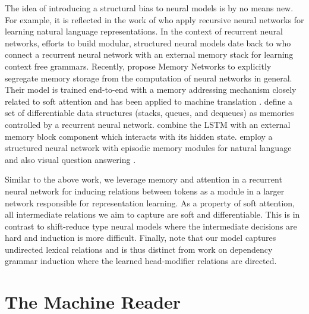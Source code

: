 \documentclass[11pt,letterpaper]{article}
\begin{document}
        The idea of introducing a structural bias to neural models is
        by no means new. For example, it is reflected in the work of
         who apply recursive neural
        networks for learning natural language representations.  In
        the context of recurrent neural networks, efforts to build
        modular, structured neural models date back to
         who connect a recurrent neural
        network with an external memory stack for learning context
        free grammars. Recently,  propose
        Memory Networks to explicitly segregate memory storage from
        the computation of neural networks in general. Their model is
        trained end-to-end with a memory addressing mechanism closely
        related to soft attention \cite{sukhbaatar2015end} and has
        been applied to machine translation \cite{meng2016deep}.
         define a set of
        differentiable data structures (stacks, queues, and dequeues)
        as memories controlled by a recurrent neural
        network.  combine the LSTM with an
        external memory block component which interacts with its
        hidden state.   employ a structured
        neural network with episodic memory modules for natural
        language and also visual question answering
        \cite{xiong2016dynamic}.
        
        Similar to the above work, we leverage memory and attention in
        a recurrent neural network for inducing relations between
        tokens as a module in a larger network responsible for
        representation learning. As a property of soft attention, all
        intermediate relations we aim to capture are soft and
        differentiable. This is in contrast to shift-reduce type
        neural models \cite{dyer2015transition,bowman2016fast} where
        the intermediate decisions are hard and induction is more
        difficult.  Finally, note that our model captures undirected
        lexical relations and is thus distinct from work on dependency
        grammar induction \cite{klein-manning:2004:ACL} where the
        learned head-modifier relations are directed.
       


	\section{The Machine Reader}
	\label{sec:machine-reader}
	
\end{document}
